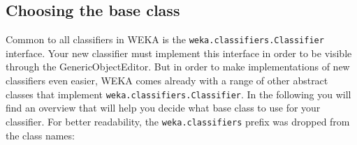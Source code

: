 %
%
%
%


\subsection{Choosing the base class}
Common to all classifiers in WEKA is the \texttt{weka.classifiers.Classifier}
interface. Your new classifier must implement this interface in order to be
visible through the GenericObjectEditor. But in order to make implementations of
new classifiers even easier, WEKA comes already with a range of other abstract
classes that implement \texttt{weka.classifiers.Classifier}. In the following
you will find an overview that will help you decide what base class to use for
your classifier. For better readability, the \texttt{weka.classifiers} prefix
was dropped from the class names:
